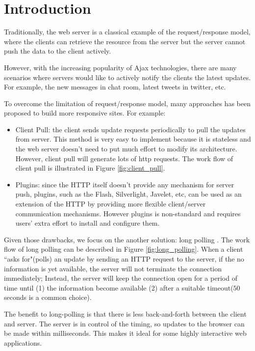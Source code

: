 \section {Introduction\\}
Traditionally, the web server is a classical example of the request/response 
model, where the clients can retrieve the resource from the server but the 
server cannot push the data to the client actively. 

However, with the increasing popularity of Ajax\cite{Ajax} technologies, there 
are many scenarios where servers would like to actively notify the clients the 
latest updates. For example, the new messages in chat room, latest tweets in 
twitter, etc.

To overcome the limitation of request/response model, many approaches has been 
proposed to build more responsive sites. For example:

\begin{itemize}
\item Client Pull: the client sends update requests periodically to pull the
updates from server. This method is very easy to implement because 
it is stateless and the web server doesn't need to put much effort to modify 
its architecture. However, client pull will generate lots of http requests.
The work flow of client pull is illustrated in Figure \ref{fig:client_pull}.

\item Plugins: since the HTTP itself doesn't provide any mechanism for server 
push, plugins, such as the Flash, Silverlight, Javelet, etc, can be used as an 
extension of the HTTP by providing more flexible client/server communication 
mechanisms. However plugins is non-standard and requires users' extra effort to 
install and configure them.
\end{itemize}

Given those drawbacks, we focus on the another solution: long polling
\cite{LongPolling}. The work flow of long polling can be described in Figure
\ref{fig:long_polling}. When a client ``asks for"(polls) an update by sending 
an HTTP request to the server, if the no information is yet available, the 
server will not terminate the connection immediately; Instead, the server 
will keep the connection open for a period of time until (1) the information 
become available (2) after a suitable timeout($50$ seconds is a common choice).

The benefit to long-polling is that there is less back-and-forth between the 
client and server. The server is in control of the timing, so updates to the
browser can be made within milliseconds. This makes it ideal for some highly
interactive web applications.

